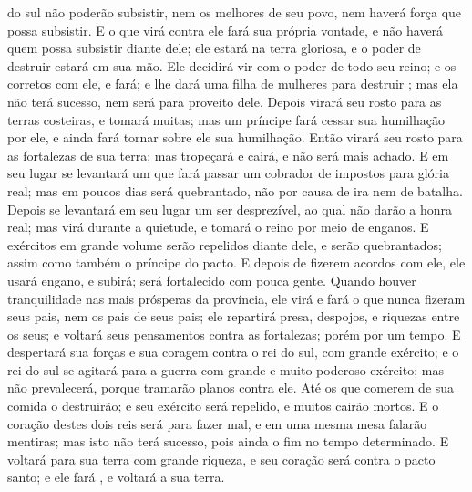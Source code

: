 { do sul não poderão subsistir, nem os melhores de seu povo, nem haverá força que possa subsistir.
E o que virá contra ele fará sua própria vontade, e não haverá quem possa subsistir diante dele; ele estará na terra gloriosa, e o poder de destruir estará em sua mão.
Ele decidirá
 vir com o poder de todo seu reino; e os corretos com ele, e
{} fará; e lhe dará uma filha de mulheres para destruir
{} ; mas ela não terá sucesso, nem será para proveito dele.
Depois virará seu rosto para as terras costeiras, e tomará muitas; mas um príncipe fará cessar sua humilhação por ele, e ainda fará tornar sobre ele sua humilhação.
Então virará seu rosto para as fortalezas de sua terra; mas tropeçará e cairá, e não será mais achado.
E em seu lugar se levantará um que fará passar um cobrador de impostos para glória real; mas em poucos dias será quebrantado, não por causa de ira nem de batalha.
Depois se levantará em seu lugar um ser desprezível, ao qual não darão a honra real; mas virá durante a quietude, e tomará o reino por meio de enganos.
E exércitos em grande volume
 serão repelidos diante dele, e serão quebrantados; assim como também o príncipe do pacto.
E depois de fizerem acordos com ele, ele usará engano, e subirá; será fortalecido
{} com pouca gente.
Quando houver tranquilidade nas mais prósperas
{} da província, ele virá e fará o que nunca fizeram seus pais, nem os pais de seus pais; ele repartirá presa, despojos, e riquezas entre os seus; e voltará seus pensamentos contra as fortalezas; porém
{} por um tempo.
E despertará sua forças e sua coragem
 contra o rei do sul, com grande exército; e o rei do sul se agitará para a guerra com grande e muito poderoso exército; mas não prevalecerá, porque tramarão planos contra ele.
Até os que comerem de sua comida o destruirão; e seu exército será repelido,
 e muitos cairão mortos.
E o coração destes dois reis será para fazer mal, e em uma mesma mesa falarão mentiras; mas isto não terá sucesso, pois ainda
{} o fim no tempo determinado.
E voltará para sua terra com grande riqueza, e seu coração será contra o pacto santo; e ele fará
{} , e voltará a sua terra.
}
